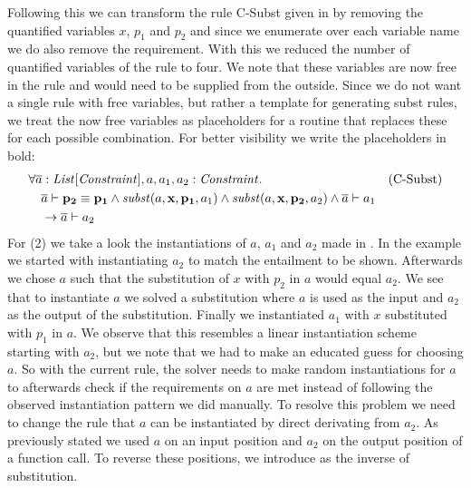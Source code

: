 Following this we can transform the rule C-Subst given in 
by removing the quantified variables $x$, $p_1$ and $p_2$
and since we enumerate over each variable name
we do also remove the  requirement.
With this we reduced the number of quantified variables
of the rule to four.
We note that these variables are now free in the rule
and would need to be supplied from the outside.
Since we do not want a single rule with free variables,
but rather a template for generating subst rules,
we treat the now free variables as placeholders for
a routine that replaces these for each possible combination.
For better visibility we write the placeholders in bold: %
\begin{align*}
&\forall \overline{a}: \mathit{List[\mathit{Constraint}]}, a, a_1, a_2: \mathit{Constraint}. && \text{(C-Subst)} \\
&\quad \overline{a} \vdash \mathit{\mathbf{p_2}} \equiv \mathit{\mathbf{p_1}}
         \land \mathit{subst}(a, \mathbf{x}, \mathbf{p_1}, a_1) \land \mathit{subst}(a, \mathbf{x}, \mathbf{p_2}, a_2)
       \land \overline{a} \vdash a_1\\
&\quad \rightarrow \overline{a} \vdash a_2
\end{align*}
%
For (2) we take a look the instantiations of $a$, $a_1$ and $a_2$
made in .
In the example we started with instantiating $a_2$ to match
the entailment to be shown.
Afterwards we chose $a$ such that the substitution of
$x$ with $p_2$ in $a$ would equal $a_2$.
We see that to instantiate $a$ we solved a substitution
where $a$ is used as the input and $a_2$ as the output of the substitution.
Finally we instantiated $a_1$ with $x$ substituted with $p_1$ in $a$.
We observe that this resembles a linear instantiation scheme starting with $a_2$,
but we note that we had to make an educated guess for choosing $a$.
So with the current rule, the solver needs to make random instantiations
for $a$ to afterwards check if the requirements on $a$ are met
instead of following the observed instantiation pattern we did manually.
To resolve this problem we need to change the rule that $a$ can be
instantiated by direct derivating from $a_2$.
As previously stated we used $a$ on an input position
and $a_2$ on the output position of a function call.
To reverse these positions, we introduce  as
the inverse of substitution.

